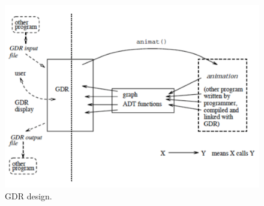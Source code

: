 \begin{figure}[p]

\begin{center}
\includegraphics[scale=0.6]{X_gdr_design}
\end{center}

\caption{GDR design.}
\label{fig:gdr}
\end{figure}
